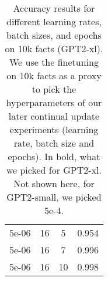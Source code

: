 \begin{table}[ht]
{\begin{tabular}{cccc}
5e-06                  & 16                  & 5               & 0.954             \\ 
5e-06                  & 16                  & 7               & 0.996             \\ 
5e-06                  & 16                  & 10              & 0.998             \\ 
\bottomrule
\end{tabular}
}
\caption{Accuracy results for different learning rates, batch sizes, and epochs on 10k facts (GPT2-xl). We use the finetuning on 10k facts as a proxy to pick the hyperparameters of our later continual update experiments (learning rate, batch size and epochs). In bold, what we picked for GPT2-xl. Not shown here, for GPT2-small, we picked 5e-4.}
\label{tab:lr:search}
\end{table}

